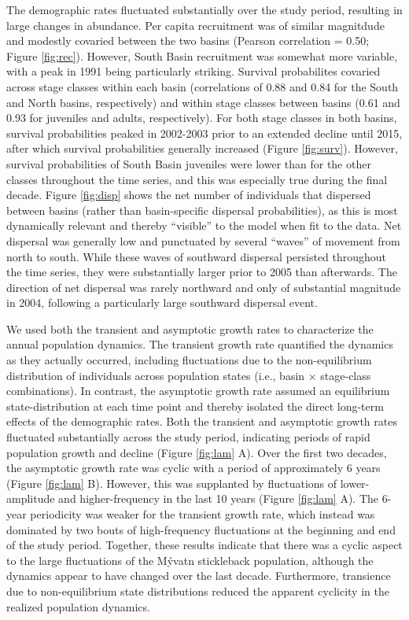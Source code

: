 \documentclass[11pt]{article}
\begin{document}
The demographic rates fluctuated substantially over the study period,
resulting in large changes in abundance. 
Per capita recruitment was of similar magnitdude and modestly covaried between the two basins
(Pearson correlation = 0.50; Figure \ref{fig:rec}).
However, South Basin recruitment was somewhat more variable,
with a peak in 1991 being particularly striking.
Survival probabilites covaried across stage classes within each basin
(correlations of 0.88 and 0.84 for the South and North basins, respectively)
and within stage classes between basins (0.61 and 0.93 for juveniles and adults, respectively).
For both stage classes in both basins, 
survival probabilities peaked in 2002-2003 
prior to an extended decline until 2015,
after which survival probabilities generally increased (Figure \ref{fig:surv}).
However, survival probabilities of South Basin juveniles were lower 
than for the other classes throughout the time series, 
and this was especially true during the final decade.
Figure \ref{fig:disp} shows the net number of individuals
that dispersed between basins (rather than basin-specific dispersal probabilities),
as this is most dynamically relevant 
and thereby ``visible'' to the model when fit to the data.
Net dispersal was generally low and punctuated by several ``waves'' of movement from 
north to south. 
While these waves of southward dispersal persisted throughout the time series,
they were substantially larger prior to 2005 than afterwards.
The direction of net dispersal was rarely northward and only of substantial magnitude in 2004,
following a particularly large southward dispersal event.

We used both the transient and asymptotic growth rates 
to characterize the annual population dynamics.
The transient growth rate quantified the dynamics as they actually occurred,
including fluctuations due to the non-equilibrium distribution of individuals across 
population states (i.e., basin $\times$ stage-class combinations).
In contrast, the asymptotic growth rate assumed an equilibrium state-distribution 
at each time point and thereby isolated the direct long-term effects of the demographic rates.
Both the transient and asymptotic growth rates fluctuated substantially 
across the study period, 
indicating periods of rapid population growth and decline (Figure \ref{fig:lam} A).
Over the first two decades, 
the asymptotic growth rate was cyclic with a period of approximately 6 years
(Figure \ref{fig:lam} B).
However, this was supplanted by fluctuations of lower-amplitude and higher-frequency  
in the last 10 years (Figure \ref{fig:lam} A).
The 6-year periodicity was weaker for the transient growth rate,
which instead was dominated by two bouts of high-frequency fluctuations
at the beginning and end of the study period.
Together, these results indicate that there was a cyclic aspect to the large fluctuations 
of the M\'{y}vatn stickleback population, 
although the dynamics appear to have changed over the last decade.
Furthermore, transience due to non-equilibrium state distributions
reduced the apparent cyclicity in the realized population dynamics.
\end{document}
